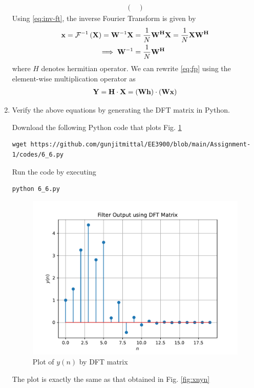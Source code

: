 \documentclass[journal,12pt,twocolumn]{IEEEtran}
\renewcommand\thesection{\arabic{section}}
\begin{document}
\begin{enumerate}[label=\thesection.\arabic*]
\begin{align}
\begin{pmatrix}
   \end{pmatrix}
 \end{align}
 \noindent Using \eqref{eq:inv-ft}, the inverse Fourier Transform is given by
 \begin{align}
   \mathbf{x} = \mathcal{F}^{-1}\left(\mathbf{X}\right) = \mathbf{W}^{-1}\mathbf{X} &= \frac{1}{N}\mathbf{W^{H}}\mathbf{X} = \frac{1}{N}\mathbf{X}\mathbf{W^{H}} \\ 
   \implies \mathbf{W}^{-1} &= \frac{1}{N}\mathbf{W^{H}}
 \end{align}
 \noindent where $H$ denotes hermitian operator. We can rewrite \eqref{eq:fp} using the element-wise multiplication operator as
 \begin{align}
   \mathbf{Y} = \mathbf{H}\cdot\mathbf{X} = \left(\mathbf{W}\mathbf{h}\right)\cdot\left(\mathbf{W}\mathbf{x}\right)
 \end{align}
 \item Verify the above equations by generating the DFT matrix in Python.
	
	\solution Download the following Python code that plots Fig. \ref{fig-6.5}
	\begin{lstlisting}
wget https://github.com/gunjitmittal/EE3900/blob/main/Assignment-1/codes/6_6.py
	\end{lstlisting}
	
	Run the code by executing
	\begin{lstlisting}
python 6_6.py
	\end{lstlisting}
	
	\begin{figure}[!ht]

		\centering
		\includegraphics[width=0.8\columnwidth]{./figs/6_6.pdf}
		\caption{Plot of $y(n)$ by DFT matrix}
		\label{fig-6.5}	
	\end{figure}
	
	The plot is exactly the same as that obtained in Fig. \ref{fig:xnyn}

 \end{enumerate}
\end{document}
